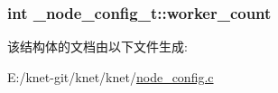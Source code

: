 \subsubsection[{worker\+\_\+count}]{\setlength{\rightskip}{0pt plus 5cm}int \+\_\+node\+\_\+config\+\_\+t\+::worker\+\_\+count}\label{a00034_a7876f9ae03c9a187d39d655a30e3f3c5_a7876f9ae03c9a187d39d655a30e3f3c5}


该结构体的文档由以下文件生成\+:\begin{DoxyCompactItemize}
\item 
E\+:/knet-\/git/knet/knet/\hyperlink{a00104}{node\+\_\+config.\+c}\end{DoxyCompactItemize}
